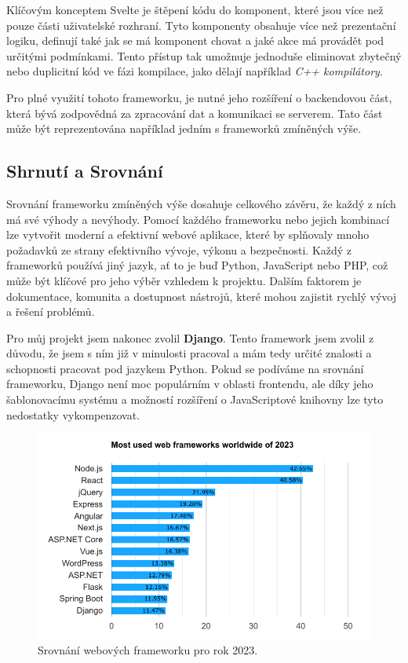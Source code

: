 Klíčovým konceptem Svelte je štěpení kódu do komponent, které jsou více než pouze části uživatelské rozhraní. Tyto komponenty obsahuje více než prezentační logiku, definují také jak se má komponent chovat a jaké akce má provádět pod určitými podmínkami. Tento přístup tak umožnuje jednoduše eliminovat zbytečný nebo duplicitní kód ve fázi kompilace, jako dělají například \textit{C++ kompilátory}.

Pro plné využití tohoto frameworku, je nutné jeho rozšíření o backendovou část, která bývá zodpovědná za zpracování dat a komunikaci se serverem. Tato část může být reprezentována například jedním s frameworků zmíněných výše. \cite{about_svelte}

\subsection{Shrnutí a Srovnání}
\label{subsec:dev-framework-comparison}
Srovnání frameworku zmíněných výše dosahuje celkového závěru, že každý z ních má své výhody a nevýhody. Pomocí každého frameworku nebo jejich kombinací lze vytvořit moderní a efektivní webové aplikace, které by splňovaly mnoho požadavků ze strany efektivního vývoje, výkonu a bezpečnosti.
Každý z frameworků používá jiný jazyk, ať to je buď Python, JavaScript nebo PHP, což může být klíčové pro jeho výběr vzhledem k projektu. Dalším faktorem je dokumentace, komunita a dostupnost nástrojů, které mohou zajistit rychlý vývoj a řešení problémů.

Pro můj projekt jsem nakonec zvolil \textbf{Django}. Tento framework jsem zvolil z důvodu, že jsem s ním již v minulosti pracoval a mám tedy určité znalosti a schopnosti pracovat pod jazykem Python. Pokud se podíváme na srovnání frameworku, Django není moc populárním v oblasti frontendu, ale díky jeho šablonovacímu systému a možností rozšíření o JavaScriptové knihovny lze tyto nedostatky vykompenzovat.

\begin{figure}[H]
    \centering
    \includegraphics{figures/frameworkGraphs}
    \caption{Srovnání webových frameworku pro rok 2023. \cite{framework_comparison}}
    \label{fig:framework_comparison}
\end{figure}

